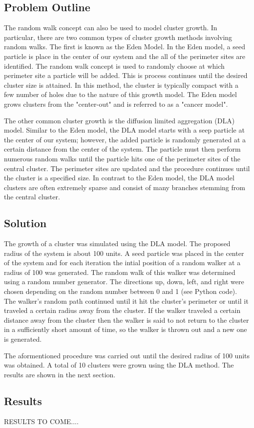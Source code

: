 \documentclass[a4paper,12pt]{article}
\begin{document}
\subsection{Problem Outline}
\indent
\indent The random walk concept can also be used to model cluster growth.  In particular, there are two common types of cluster growth methods involving random walks.
The first is known as the Eden Model.  In the Eden model, a seed particle is place in the center of our system and the all of the perimeter sites are identified.  The 
random walk concept is used to randomly choose at which perimeter site a particle will be added.  This is process continues until the desired cluster size is attained.
In this method, the cluster is typically compact with a few number of holes due to the nature of this growth model.  The Eden model grows clusters from the "center-out" 
and is referred to as a "cancer model". 

\indent The other common cluster growth is the diffusion limited aggregation (DLA) model.  Similar to the Eden model, the DLA model starts with a seep particle at 
the center of our system; however, the added particle is randomly generated at a certain distance from the center of the system.  The particle must then perform 
numerous random walks until the particle hits one of the perimeter sites of the central cluster.  The perimeter sites are updated and the procedure continues until
the cluster is a specified size.  In contrast to the Eden model, the DLA model clusters are often extremely sparse and consist of many branches stemming from the 
central cluster.

\subsection{Solution}
\indent
\indent The growth of a cluster was simulated using the DLA model.  The proposed radius of the system is about 100 units.  A seed particle was placed in the center of 
the system and for each iteration the intial position of a random walker at a radius of 100 was generated.  The random walk of this walker was determined using a 
random number generator.  The directions up, down, left, and right were chosen depending on the random number between 0 and 1 (see Python code). The walker's random path
continued until it hit the cluster's perimeter or until it traveled a certain radius away from the cluster.  If the walker traveled a certain distance away from the 
cluster then the walker is said to not return to the cluster in a sufficiently short amount of time, so the walker is thrown out and a new one is generated.

\indent The aformentioned procedure was carried out until the desired radius of 100 units was obtained.  A total of 10 clusters were grown using the DLA method.  The
results are shown in the next section.

\subsection{Results}  
\indent RESULTS TO COME....
\end{document}
